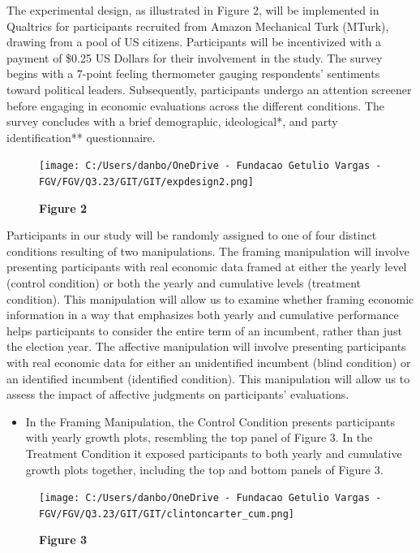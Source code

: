 \documentclass[
]{article}
\providecommand{\tightlist}{%
  \setlength{\itemsep}{0pt}\setlength{\parskip}{0pt}}
\begin{document}
The experimental design, as illustrated in Figure 2, will be implemented
in Qualtrics for participants recruited from Amazon Mechanical Turk
(MTurk), drawing from a pool of US citizens. Participants will be
incentivized with a payment of \$0.25 US Dollars for their involvement
in the study. The survey begins with a 7-point feeling thermometer
gauging respondents' sentiments toward political leaders. Subsequently,
participants undergo an attention screener before engaging in economic
evaluations across the different conditions. The survey concludes with a
brief demographic, ideological*, and party identification**
questionnaire.

\begin{figure}
\centering
\texttt{[image: C:/Users/danbo/OneDrive - Fundacao Getulio Vargas - FGV/FGV/Q3.23/GIT/GIT/expdesign2.png]}
\caption{\textbf{Figure 2}}
\end{figure}

Participants in our study will be randomly assigned to one of four
distinct conditions resulting of two manipulations. The framing
manipulation will involve presenting participants with real economic
data framed at either the yearly level (control condition) or both the
yearly and cumulative levels (treatment condition). This manipulation
will allow us to examine whether framing economic information in a way
that emphasizes both yearly and cumulative performance helps
participants to consider the entire term of an incumbent, rather than
just the election year. The affective manipulation will involve
presenting participants with real economic data for either an
unidentified incumbent (blind condition) or an identified incumbent
(identified condition). This manipulation will allow us to assess the
impact of affective judgments on participants' evaluations.

\begin{itemize}
\tightlist
\item
  In the Framing Manipulation, the Control Condition presents
  participants with yearly growth plots, resembling the top panel of
  Figure 3. In the Treatment Condition it exposed participants to both
  yearly and cumulative growth plots together, including the top and
  bottom panels of Figure 3.
\end{itemize}

\begin{figure}
\centering
\texttt{[image: C:/Users/danbo/OneDrive - Fundacao Getulio Vargas - FGV/FGV/Q3.23/GIT/GIT/clintoncarter\_cum.png]}
\caption{\textbf{Figure 3}}
\end{figure}
\end{document}
